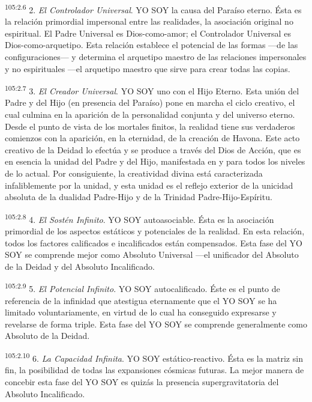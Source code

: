 \documentclass[twoside, 11pt]{book}
\begin{document}
\par
\textsuperscript{105:2.6} 2. \textit{El Controlador Universal}. YO SOY la causa del Paraíso eterno. Ésta es la relación primordial impersonal entre las realidades, la asociación original no espiritual. El Padre Universal es Dios-como-amor; el Controlador Universal es Dios-como-arquetipo. Esta relación establece el potencial de las formas ---de las configuraciones--- y determina el arquetipo maestro de las relaciones impersonales y no espirituales ---el arquetipo maestro que sirve para crear todas las copias.

\par
\textsuperscript{105:2.7} 3. \textit{El Creador Universal}. YO SOY uno con el Hijo Eterno. Esta unión del Padre y del Hijo (en presencia del Paraíso) pone en marcha el ciclo creativo, el cual culmina en la aparición de la personalidad conjunta y del universo eterno. Desde el punto de vista de los mortales finitos, la realidad tiene sus verdaderos comienzos con la aparición, en la eternidad, de la creación de Havona. Este acto creativo de la Deidad lo efectúa y se produce a través del Dios de Acción, que es en esencia la unidad del Padre y del Hijo, manifestada en y para todos los niveles de lo actual. Por consiguiente, la creatividad divina está caracterizada infaliblemente por la unidad, y esta unidad es el reflejo exterior de la unicidad absoluta de la dualidad Padre-Hijo y de la Trinidad Padre-Hijo-Espíritu.

\par
\textsuperscript{105:2.8} 4. \textit{El Sostén Infinito}. YO SOY autoasociable. Ésta es la asociación primordial de los aspectos estáticos y potenciales de la realidad. En esta relación, todos los factores calificados e incalificados están compensados. Esta fase del YO SOY se comprende mejor como Absoluto Universal ---el unificador del Absoluto de la Deidad y del Absoluto Incalificado.

\par
\textsuperscript{105:2.9} 5. \textit{El Potencial Infinito}. YO SOY autocalificado. Éste es el punto de referencia de la infinidad que atestigua eternamente que el YO SOY se ha limitado voluntariamente, en virtud de lo cual ha conseguido expresarse y revelarse de forma triple. Esta fase del YO SOY se comprende generalmente como Absoluto de la Deidad.

\par
\textsuperscript{105:2.10} 6. \textit{La Capacidad Infinita}. YO SOY estático-reactivo. Ésta es la matriz sin fin, la posibilidad de todas las expansiones cósmicas futuras. La mejor manera de concebir esta fase del YO SOY es quizás la presencia supergravitatoria del Absoluto Incalificado.
\end{document}

